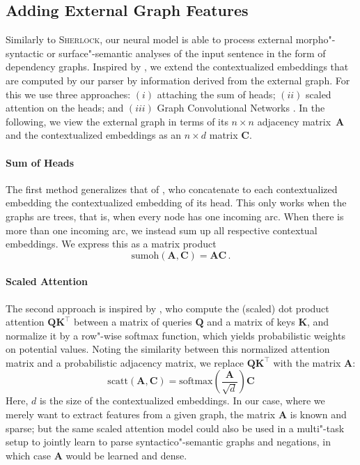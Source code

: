 \documentclass[11pt,a4paper]{article}
\let\vec=\mathbold
\theoremstyle{plain}
\begin{document}
\subsection{Adding External Graph Features}

Similarly to \textsc{Sherlock}, our neural model is able to
process external morpho"-syntactic or surface"-semantic analyses of the input sentence in the
form of dependency graphs.
Inspired by \citet{kurtz2019improving}, we extend the
contextualized embeddings that are computed by our parser by information derived from the external graph.
For this we use three approaches: $(i)$ attaching the sum of heads;
$(ii)$ scaled attention on the heads; and $(iii)$ Graph
Convolutional Networks \citep{kipf2017semisupervised}.
In the following, we view
the external graph in terms of its $n \times n$ adjacency matrix~$\vec{A}$ and
the contextualized embeddings as an $n \times d$ matrix $\vec{C}$.

\paragraph{Sum of Heads}

The first method generalizes that of \citet{kurtz2019improving}, who
concatenate to each contextualized embedding the contextualized embedding of
its head.
This only works when the graphs are trees, that is, when every node has one
incoming arc.
When there is more than one incoming arc, we instead sum up all respective
contextual embeddings.
We express this as a matrix product
\begin{displaymath}
  \text{sumoh}(\vec{A}, \vec{C}) = \vec{A} \vec{C}\,.
\end{displaymath}

\paragraph{Scaled Attention}

The second approach is inspired by \citet{vaswani2017attention}, who
compute the (scaled) dot product attention
$\vec{Q}\vec{K}^\top$ between a matrix of queries $\vec{Q}$ and
a matrix of keys $\vec{K}$, and normalize it by a row"-wise softmax
function, which yields probabilistic weights on potential values.
Noting the similarity between this normalized attention matrix and a
probabilistic adjacency matrix, we replace
$\vec{Q}\vec{K}^\top$ with the matrix $\vec{A}$:
\begin{displaymath}
  \text{scatt}(\vec{A}, \vec{C}) = \text{softmax}\left( \frac{\vec{A}}{\sqrt{d}} \right) \vec{C}
\end{displaymath}
Here, $d$ is the size of the contextualized embeddings.
In our case, where we merely want to extract features from a given graph,
the matrix $\vec{A}$ is known and sparse; but the same scaled
attention model could also be used in a multi"-task setup to
jointly learn to parse syntactico"-semantic graphs and negations, in
which case $\vec{A}$ would be learned and dense.
\end{document}
